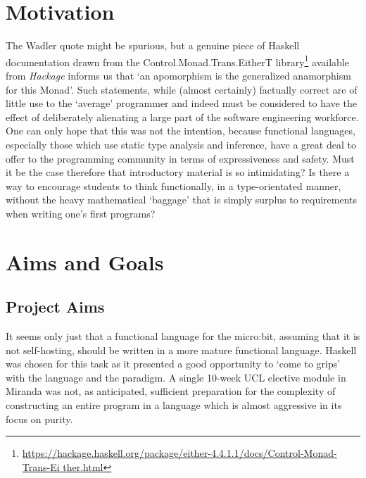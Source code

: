 \documentclass[12pt, a4paper]{report}
\begin{document}
\section{Motivation} 
The Wadler quote might be spurious, but a genuine piece of
Haskell documentation drawn from the Control.Monad.Trans.EitherT
library\footnote{\url{https://hackage.haskell.org/package/either-4.4.1.1/docs/Control-Monad-Trans-Ei
ther.html}} available from \textit{Hackage} informs us that `an apomorphism is the generalized
anamorphism for this Monad'. Such statements, while (almost certainly) factually correct are
of little use to the `average' programmer and indeed must be considered to have the effect of
deliberately alienating a large part of the software engineering workforce. One can only hope
that this was not the intention, because functional languages, especially those which use static
type analysis and inference, have a great deal to offer to the programming community in terms
of expressiveness and safety. Must it be the case therefore that introductory material is so
intimidating? Is there a way to encourage students to think functionally, in a type-orientated
manner, without the heavy mathematical `baggage' that is simply surplus to requirements when writing
one's first programs?

\section{Aims and Goals}
\subsection{Project Aims}
It seems only just that a functional language for the micro:bit, assuming that it is not
self-hosting, should be written in a more mature functional language. Haskell was chosen for this
task as it presented a good opportunity to `come to grips' with the language and the paradigm. A
single 10-week UCL elective module in Miranda was not, as anticipated, sufficient preparation for the complexity
of constructing an entire program in a language which is almost aggressive in its focus on purity. 
\end{document}
